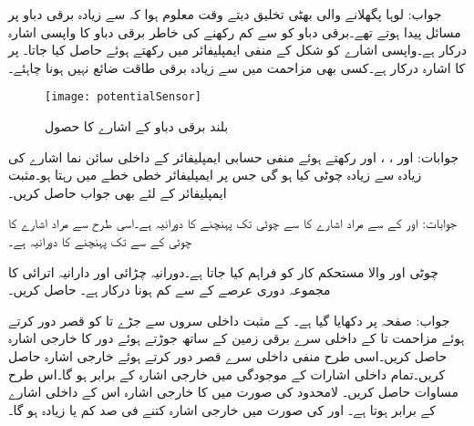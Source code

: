 جواب: 
لوہا پگھلانے والی بھٹی تخلیق دیتے وقت معلوم ہوا کہ  سے زیادہ برقی دباو پر مسائل پیدا ہوتے تھے۔برقی دباو  کو  سے کم رکھنے کی خاطر برقی دباو کا واپسی اشارہ درکار ہے۔واپسی اشارے کو شکل  کے منفی ایمپلیفائر میں  رکھتے ہوئے حاصل کیا جاتا۔ پر  کا اشارہ درکار ہے۔کسی بھی مزاحمت میں  سے زیادہ برقی طاقت ضائع نہیں ہونا چاہئے۔ 
\begin{figure}
\centering
\texttt{[image: potentialSensor]}
\caption{بلند برقی دباو کے اشارے کا حصول}
\label{شکل_سوال_بلند_برقی_دباو_اشارہ}
\end{figure}
جوابات: اور 
، ،  اور  رکھتے ہوئے منفی حسابی ایمپلیفائر کے داخلی سائن نما اشارے کی زیادہ سے زیادہ چوٹی کیا ہو گی جس پر ایمپلیفائر خطی خطے میں رہتا ہو۔مثبت ایمپلیفائر کے لئے بھی جواب حاصل کریں۔

جوابات:   اور  
 کے  سے مراد اشارے کا   سے   چوٹی تک پہنچنے کا دورانیہ ہے۔اسی طرح  سے مراد اشارے کا  چوٹی کے  سے  تک پہنچنے کا دورانیہ ہے۔

 چوٹی اور   والا  مستحکم کار کو فراہم کیا جاتا ہے۔دورانیہ چڑائی اور دارانیہ اترائی کا مجموعہ دوری عرصے کے  سے کم ہونا درکار ہے۔ حاصل کریں۔ 

جواب: 
صفحہ  پر   دکھایا گیا ہے۔  کے مثبت داخلی سروں  سے جڑے  تا  کو قصر دور کرتے ہوئے مزاحمت  تا  کے داخلی سرے برقی زمین کے ساتھ جوڑتے ہوئے  دور کا خارجی اشارہ  حاصل کریں۔اسی طرح منفی داخلی سرے  قصر دور کرتے ہوئے خارجی اشارہ  حاصل کریں۔تمام داخلی اشارات  کے موجودگی میں خارجی اشارہ  کے برابر ہو گا۔اس طرح  مساوات   حاصل کریں۔
لامحدود  کی صورت میں  کا خارجی اشارہ اس کے داخلی اشارے کے برابر ہوتا ہے۔ اور
 کی صورت میں خارجی اشارہ کتنے فی صد کم  یا زیادہ ہو گا۔

